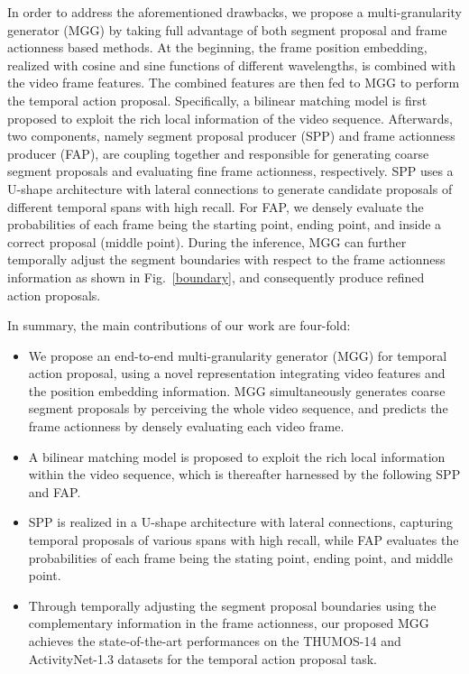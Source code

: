 \documentclass[10pt,twocolumn,letterpaper]{article}
\begin{document}
In order to address the aforementioned drawbacks, we propose a multi-granularity generator (MGG) by taking full advantage of both segment proposal and frame actionness based methods. At the beginning, the frame position embedding, realized with cosine and sine functions of different wavelengths, is combined with the video frame features.  The combined features are then fed to  MGG to perform the temporal action proposal. Specifically,  a bilinear matching model is first proposed to exploit the rich local information of the video sequence. Afterwards, two components, namely segment proposal producer (SPP) and frame actionness producer (FAP), are coupling together and responsible for generating coarse segment proposals and evaluating fine frame actionness, respectively. SPP uses a U-shape architecture with lateral connections to generate candidate proposals of different temporal spans with high recall. For FAP, we densely evaluate  the probabilities of each frame being the starting point, ending point, and inside a correct proposal (middle point). During the inference, MGG can further temporally adjust the segment boundaries with respect to the frame actionness information as shown in Fig.~\ref{boundary}, and consequently produce refined action proposals.  


In summary, the main contributions of our work are four-fold:
\begin{itemize}
    \item We propose an end-to-end multi-granularity generator (MGG) for temporal action proposal, using a novel representation integrating video features and the position embedding information. MGG simultaneously generates coarse segment proposals by perceiving the whole video sequence, and predicts the frame actionness by densely evaluating each video frame. 
\item A bilinear matching model is proposed to exploit the rich local information within the video sequence, which is thereafter harnessed by the following SPP and FAP.
    \item SPP is realized in a U-shape architecture with lateral connections, capturing temporal proposals of various spans with high recall, while FAP evaluates the probabilities of each frame being the stating point, ending point, and middle point.
    \item Through temporally adjusting the segment proposal boundaries using the complementary information in the frame actionness, our proposed MGG achieves the state-of-the-art performances on the THUMOS-14 and ActivityNet-1.3 datasets for the temporal action proposal task. 
\end{itemize}
\end{document}
